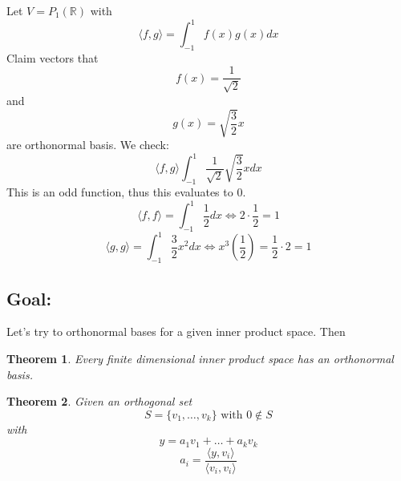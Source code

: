 \documentclass{article}
\newtheorem{theorem}{Theorem}[section]
\newtheorem{one minute paper}[theorem]{One Minute Paper}
\begin{document}
Let $V = P_1(\mathbb{R})$ with 
\begin{equation}
    \langle f,g \rangle = \int_{-1}^{1}f(x)g(x)dx
\end{equation}
Claim vectors that 
\begin{equation}
    f(x) = \frac{1}{\sqrt{2}}
\end{equation}
and 
\begin{equation}
    g(x) = \sqrt{\frac{3}{2}}x
\end{equation}
are orthonormal basis. We check:
\begin{equation}
    \langle f,g \rangle \int_{-1}^{1} \frac{1}{\sqrt{2}}\sqrt{\frac{3}{2}}xdx
\end{equation}
This is an odd function, thus this evaluates to 0.
\begin{equation}
    \langle f,f \rangle = \int_{-1}^{1}\frac{1}{2}dx \iff 2 \cdot \frac{1}{2} = 1
\end{equation}
\begin{equation}
    \langle g,g \rangle = \int_{-1}^{1}\frac{3}{2}x^2 dx \iff x^3(\frac{1}{2}) = \frac{1}{2} \cdot 2 = 1
\end{equation}

\subsection*{Goal:}
Let's try to orthonormal bases for a given inner product space. Then 
\begin{theorem}
    Every finite dimensional inner product space has an orthonormal basis. 
\end{theorem}
\begin{theorem}
    Given an orthogonal set 
    \begin{equation}
        S = \{v_1, \dots, v_k\} \text{ with } 0 \notin S
    \end{equation}
    with 
    \begin{equation}
        y = a_1v_1 + \dots + a_kv_k
    \end{equation}
    \begin{equation}
        a_i = \frac{\langle y, v_i \rangle}{\langle v_i, v_i \rangle}
    \end{equation}
\end{theorem}
\end{document}
